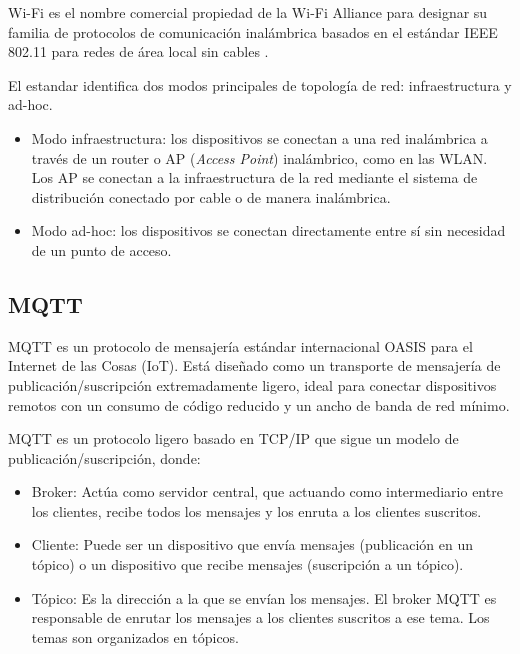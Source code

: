 Wi-Fi es el nombre comercial propiedad de la Wi-Fi Alliance para designar su
familia de protocolos de comunicación inalámbrica basados en el estándar IEEE
802.11 para redes de área local sin cables \cite{Li2019}.

El estandar identifica dos modos principales de topología de red:
infraestructura y ad-hoc.

\begin{itemize}
	\item Modo infraestructura: los dispositivos se conectan a una red inalámbrica a
	      través de un router o AP (\textit{Access Point}) inalámbrico, como en las WLAN.
	      Los AP se conectan a la infraestructura de la red mediante el sistema de
	      distribución conectado por cable o de manera inalámbrica.
	\item Modo ad-hoc: los dispositivos se conectan directamente entre sí sin necesidad
	      de un punto de acceso.
\end{itemize}

\subsection{MQTT}

MQTT es un protocolo de mensajería estándar internacional OASIS
\cite{OASIS_MQTT_Standard} para el Internet de las Cosas (IoT). Está diseñado
como un transporte de mensajería de publicación/suscripción extremadamente
ligero, ideal para conectar dispositivos remotos con un consumo de código
reducido y un ancho de banda de red mínimo.

MQTT es un protocolo ligero basado en TCP/IP \cite{AWS_MQTT} que sigue un
modelo de publicación/suscripción, donde:

\begin{itemize}
	\item Broker: Actúa como servidor central, que actuando como intermediario entre los
	      clientes, recibe todos los mensajes y los enruta a los clientes suscritos.
	\item Cliente: Puede ser un dispositivo que envía mensajes (publicación en un tópico)
	      o un dispositivo que recibe mensajes (suscripción a un tópico).
	\item Tópico: Es la dirección a la que se envían los mensajes. El broker MQTT es
	      responsable de enrutar los mensajes a los clientes suscritos a ese tema. Los
	      temas son organizados en tópicos.
\end{itemize}

